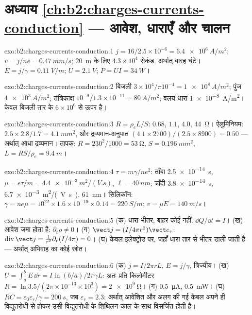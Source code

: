 \section*{अध्याय \ref{ch:b2:charges-currents-conduction} --- आवेश, धाराएँ और चालन}

\begin{solution}{exo:b2:charges-currents-conduction:1}
$j = 16/2.5 \times 10^{-6} = \qty{6.4e6}{A/m^2}$; $v = j/ne = \qty{0.47}{mm/s}$; \qty{20}{m}
के लिए $4.3 \times 10^4$ सेकंड, अर्थात् बारह घंटे। $E = j/\gamma = \qty{0.11}{V/m}$; $U = \qty{2.1}{V}$;
$P = UI = \qty{34}{W}$।
\end{solution}

\begin{solution}{exo:b2:charges-currents-conduction:2}
बिजली $3 \times 10^4/\pi10^{-4} = \qty{1e8}{A/m^2}$; पुंज $\qty{4e3}{A/m^2}$; तंत्रिकाक्ष
$10^{-9}/1.3 \times 10^{-11} = \qty{80}{A/m^2}$; वलय धारा \qty{1e-8}{A/m^2}। केवल
बिजली तार के $6 \times 10^6$ से ऊपर है।
\end{solution}

\begin{solution}{exo:b2:charges-currents-conduction:3}
$R = \rho_eL/S$: $0.68$, $1.1$, $4.0$, \qty{44}{\ohm}। ऐलुमिनियम: $2.5 \times 2.8/1.7 =
\qty{4.1}{mm^2}$, और द्रव्यमान-अनुपात $(4.1 \times 2700)/(2.5 \times 8900) = 0.50$ --- अर्थात् आधा द्रव्यमान।
तापक: $R = 230^2/1000 = \qty{53}{\ohm}$, $S = \qty{0.196}{mm^2}$, $L = RS/\rho_e = \qty{9.4}{m}$।
\end{solution}

\begin{solution}{exo:b2:charges-currents-conduction:4}
$\tau = m\gamma/ne^2$: ताँबा \qty{2.5e-14}{s}, $\mu = e\tau/m = \qty{4.4e-3}{m^2/(V.s)}$,
$\ell = \qty{40}{nm}$; चाँदी \qty{3.8e-14}{s}, \qty{6.7e-3}{m^2/(V.s)}, \qty{61}{nm}।
सिलिकॉन: $\gamma = ne\mu = 10^{22} \times 1.6 \times 10^{-19} \times 0.14 = \qty{220}{S/m}$; $v =
\mu E = \qty{140}{m/s}$।
\end{solution}

\begin{solution}{exo:b2:charges-currents-conduction:5}
(क) धारा भीतर, बाहर कोई नहीं: $\dd Q/\dd t = I$। (ख) आवेश जमा होता है: $\partial_t
\rho \ne 0$। (ग) $\vect j = (I/4\pi r^2)\vect e_r$: $\operatorname{div}\vect j = \frac1{r^2}
\partial_r(I/4\pi) = 0$। (घ) केवल इलेक्ट्रोड पर, जहाँ धारा तार से
भीतर डाली जाती है --- अर्थात् अभिवाह का कोई स्रोत।
\end{solution}

\begin{solution}{exo:b2:charges-currents-conduction:6}
(क) $j = I/2\pi rL$, $E = j/\gamma$, त्रिज्यीय। (ख) $U = \int_a^bE\,\dd r = I\ln(b/a)/
2\pi\gamma L$: अतः प्रति किलोमीटर $R = \ln3.5/(2\pi \times 10^{-13} \times 10^3) = \qty{2e9}{\ohm}$।
(ग) \qty{0.5}{\micro A}, \qty{0.5}{mW}। (घ) $RC = \varepsilon_0\varepsilon_r/\gamma = \qty{200}{s}$, जब $\varepsilon_r = 2.3$:
अर्थात् आवेशित और अलग की गई केबल अपने ही विद्युतरोधी से होकर उसी विद्युतरोधी के
शिथिलन काल के साथ विसर्जित होती है।
\end{solution}

